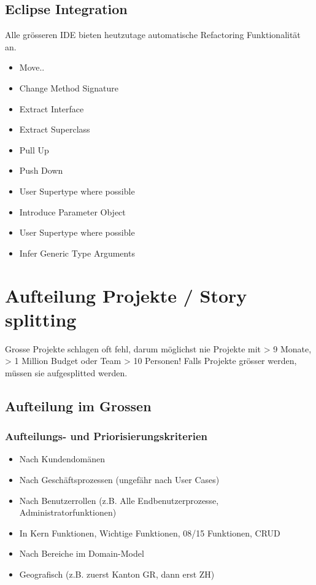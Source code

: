 \subsection{Eclipse Integration}
Alle grösseren IDE bieten heutzutage automatische Refactoring Funktionalität an.

\begin{itemize}
	\item Move..
	\item Change Method Signature
	\item Extract Interface 
	\item Extract Superclass
	\item Pull Up
	\item Push Down
	\item User Supertype where possible
	\item Introduce Parameter Object
	\item User Supertype where possible
	\item Infer Generic Type Arguments
\end{itemize}

\section{Aufteilung Projekte / Story splitting}

Grosse Projekte schlagen oft fehl, darum möglichst nie Projekte mit > 9 Monate, > 1 Million Budget oder Team > 10 Personen! Falls Projekte grösser werden, müssen sie aufgesplitted werden.

\subsection{Aufteilung im Grossen}
\subsubsection{Aufteilungs- und Priorisierungskriterien}

\begin{itemize}
	\item Nach Kundendomänen
	\item Nach Geschäftsprozessen (ungefähr nach User Cases)
	\item Nach Benutzerrollen (z.B. Alle Endbenutzerprozesse, Administratorfunktionen)
	\item In Kern Funktionen, Wichtige Funktionen, 08/15 Funktionen, CRUD
	\item Nach Bereiche im Domain-Model
	\item Geografisch (z.B. zuerst Kanton GR, dann erst ZH)
\end{itemize}

